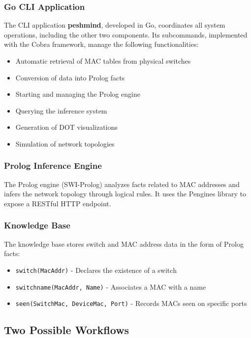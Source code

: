 \documentclass[12pt,a4paper]{article}
\begin{document}
\subsubsection{Go CLI Application}

The CLI application \textbf{peshmind}, developed in Go, coordinates all system operations, including the
other two components. Its subcommands, implemented with the Cobra framework, manage the following functionalities:

\begin{itemize}
    \item Automatic retrieval of MAC tables from physical switches
    \item Conversion of data into Prolog facts
    \item Starting and managing the Prolog engine
    \item Querying the inference system
    \item Generation of DOT visualizations
    \item Simulation of network topologies
\end{itemize}

\subsubsection{Prolog Inference Engine}

The Prolog engine (SWI-Prolog) analyzes facts related to MAC addresses and infers the network topology through logical rules. It uses the Pengines library to expose a RESTful HTTP endpoint.

\subsubsection{Knowledge Base}

The knowledge base stores switch and MAC address data in the form of Prolog facts:

\begin{itemize}
    \item \texttt{switch(MacAddr)} - Declares the existence of a switch
    \item \texttt{switchname(MacAddr, Name)} - Associates a MAC with a name
    \item \texttt{seen(SwitchMac, DeviceMac, Port)} - Records MACs seen on specific ports
\end{itemize}

\subsection{Two Possible Workflows}
\end{document}
